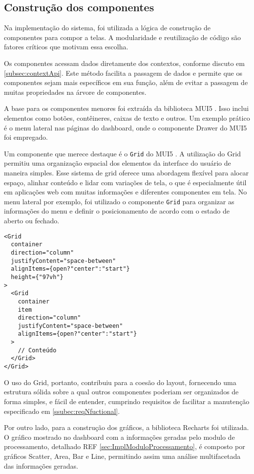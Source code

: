 \subsection{Construção dos componentes}\label{subsec:componentization}
Na implementação do sistema, foi utilizada a lógica de construção de componentes \cite{reactFirstComponent} para compor a telas. A modularidade e reutilização de código são fatores críticos que motivam essa escolha. 

Os componentes acessam dados diretamente dos contextos, conforme discuto em \ref{subsec:contextApi}. Este método facilita a passagem de dados e permite que os componentes sejam mais específicos em sua função, além de evitar a passagem de muitas propriedades na árvore de componentes.

A base para os componentes menores foi extraída da biblioteca \gls{MUI5} \cite{muiDocs}. Isso inclui elementos como botões, contêineres, caixas de texto e outros. Um exemplo prático é o menu lateral nas páginas do dashboard, onde o componente Drawer do \gls{MUI5} foi empregado. 

Um componente que merece destaque é o \texttt{Grid} do \gls{MUI5} \cite{muiReactGrid}. A utilização do Grid permitiu uma organização espacial dos elementos da interface do usuário de maneira simples. Esse sistema de grid oferece uma abordagem flexível para alocar espaço, alinhar conteúdo e lidar com variações de tela, o que é especialmente útil em aplicações web com muitas informações e diferentes componentes em tela. No menu lateral por exemplo, foi utilizado o componente \texttt{Grid} para organizar as informações do menu e definir o posicionamento de acordo com o estado de aberto ou fechado.

\begin{verbatim}
<Grid 
  container
  direction="column"
  justifyContent="space-between"
  alignItems={open?"center":"start"}
  height={"97vh"}
>
  <Grid 
    container
    item
    direction="column"
    justifyContent="space-between"
    alignItems={open?"center":"start"}
  >
    // Conteúdo
  </Grid>
</Grid>
\end{verbatim}

O uso do Grid, portanto, contribuiu para a coesão do layout, fornecendo uma estrutura sólida sobre a qual outros componentes poderiam ser organizados de forma simples, e fácil de entender, cumprindo requisitos de facilitar a manutenção especificado em \ref{ssubec:reqNfuctional}.

Por outro lado, para a construção dos gráficos, a biblioteca Recharts foi utilizada. O gráfico mostrado no dashboard com a informações geradas pelo modulo de processamento, detalhado REF \ref{sec:ImplModuloProcessamento}, é composto por gráficos Scatter, Area, Bar e Line, permitindo assim uma análise multifacetada das informações geradas. 

